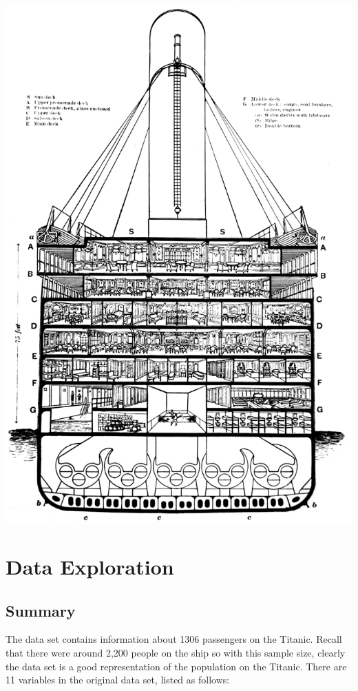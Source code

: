 \documentclass[12pt, oneside]{book}
\theoremstyle{definition}
\theoremstyle{definition}
\theoremstyle{definition}
\theoremstyle{remark}
\begin{document}
\includegraphics{assets/cross_section.png}

\hypertarget{data_explore}{%
\chapter{Data Exploration}\label{data_explore}}

\hypertarget{summary}{%
\section{Summary}\label{summary}}

The data set contains information about 1306 passengers on the Titanic.
Recall that there were around 2,200 people on the ship so with this
sample size, clearly the data set is a good representation of the
population on the Titanic. There are 11 variables in the original data
set, listed as follows:
\end{document}
